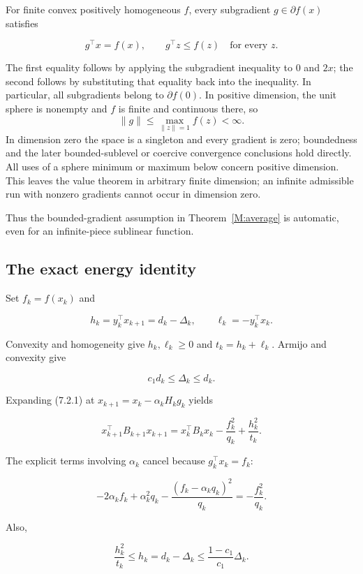For finite convex positively homogeneous \(f\), every subgradient
\(g\in\partial f(x)\) satisfies

\[
g^\top x=f(x),\qquad g^\top z\le f(z)\quad\text{for every }z.
\]

The first equality follows by applying the subgradient inequality to
\(0\) and \(2x\); the second follows by substituting that equality back
into the inequality. In particular, all subgradients belong to
\(\partial f(0)\). In positive dimension, the unit sphere is nonempty and \(f\) is finite and continuous there, so
\[
\|g\|\le\max_{\|z\|=1}f(z)<\infty.
\]
In dimension zero the space is a singleton and every gradient is zero; boundedness and the later bounded-sublevel or coercive convergence conclusions hold directly. All uses of a sphere minimum or maximum below concern positive dimension. This leaves the value theorem in arbitrary finite dimension; an infinite admissible run with nonzero gradients cannot occur in dimension zero.

Thus the bounded-gradient assumption in Theorem~\ref{M:average} is automatic, even for
an infinite-piece sublinear function.



\subsection{The exact energy
identity}\label{H:the-exact-energy-identity}

Set \(f_k=f(x_k)\) and

\[
h_k=y_k^\top x_{k+1}=d_k-\Delta_k,\qquad
\ell_k=-y_k^\top x_k.
\]

Convexity and homogeneity give \(h_k,\ell_k\ge0\) and
\(t_k=h_k+\ell_k\). Armijo and convexity give

\[
c_1d_k\le\Delta_k\le d_k.
\]

Expanding (7.2.1) at \(x_{k+1}=x_k-\alpha_kH_kg_k\) yields

\[
\boxed{
x_{k+1}^\top B_{k+1}x_{k+1}
=x_k^\top B_kx_k-\frac{f_k^2}{q_k}+\frac{h_k^2}{t_k}.
}
\tag{7.5.1}
\]

The explicit terms involving \(\alpha_k\) cancel because
\(g_k^\top x_k=f_k\):

\[
-2\alpha_k f_k+\alpha_k^2q_k
-\frac{(f_k-\alpha_kq_k)^2}{q_k}
=-\frac{f_k^2}{q_k}.
\]

Also,

\[
\frac{h_k^2}{t_k}\le h_k=d_k-\Delta_k
\le\frac{1-c_1}{c_1}\Delta_k.
\]

